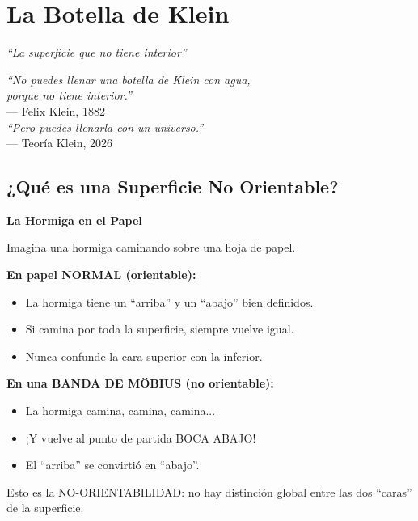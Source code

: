 \chapter{La Botella de Klein}
\label{cap:botella}

\begin{center}
\textit{``La superficie que no tiene interior''}
\end{center}

\vspace{0.5cm}

\begin{tcolorbox}[colback=white, colframe=kleinblue, boxrule=2pt]
\centering
\textit{``No puedes llenar una botella de Klein con agua,\\
porque no tiene interior.''}\\
--- Felix Klein, 1882\\[0.3cm]
\textit{``Pero puedes llenarla con un universo.''}\\
--- Teoría Klein, 2026
\end{tcolorbox}


\section{¿Qué es una Superficie No Orientable?}

\begin{analogiabox}
\textbf{La Hormiga en el Papel}

Imagina una hormiga caminando sobre una hoja de papel.

\textbf{En papel NORMAL (orientable):}
\begin{itemize}
    \item La hormiga tiene un ``arriba'' y un ``abajo'' bien definidos.
    \item Si camina por toda la superficie, siempre vuelve igual.
    \item Nunca confunde la cara superior con la inferior.
\end{itemize}

\textbf{En una BANDA DE MÖBIUS (no orientable):}
\begin{itemize}
    \item La hormiga camina, camina, camina...
    \item ¡Y vuelve al punto de partida BOCA ABAJO!
    \item El ``arriba'' se convirtió en ``abajo''.
\end{itemize}

Esto es la NO-ORIENTABILIDAD: no hay distinción global
entre las dos ``caras'' de la superficie.
\end{analogiabox}

